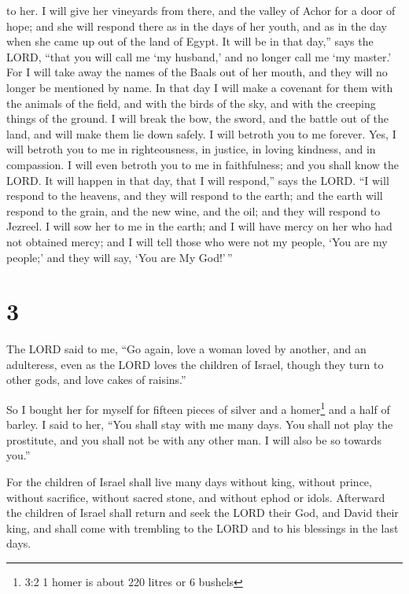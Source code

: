 to her.  I will give her vineyards from there, and the
valley of Achor for a door of hope; and she will respond there as in the
days of her youth, and as in the day when she came up out of the land of
Egypt.  It will be in that day,'' says the LORD, ``that you
will call me `my husband,' and no longer call me `my master.'
 For I will take away the names of the Baals out of her
mouth, and they will no longer be mentioned by name.  In
that day I will make a covenant for them with the animals of the field,
and with the birds of the sky, and with the creeping things of the
ground. I will break the bow, the sword, and the battle out of the land,
and will make them lie down safely.  I will betroth you to
me forever. Yes, I will betroth you to me in righteousness, in justice,
in loving kindness, and in compassion.  I will even betroth
you to me in faithfulness; and you shall know the LORD.  It
will happen in that day, that I will respond,'' says the LORD. ``I will
respond to the heavens, and they will respond to the earth;
 and the earth will respond to the grain, and the new wine,
and the oil; and they will respond to Jezreel.  I will sow
her to me in the earth; and I will have mercy on her who had not
obtained mercy; and I will tell those who were not my people, `You are
my people;' and they will say, `You are My God!'\,''

\hypertarget{section-2}{%
\section{3}\label{section-2}}

 The LORD said to me, ``Go again, love a woman loved by
another, and an adulteress, even as the LORD loves the children of
Israel, though they turn to other gods, and love cakes of raisins.''

 So I bought her for myself for fifteen pieces of silver and
a homer\footnote{3:2 1 homer is about 220 litres or 6 bushels} and a
half of barley.  I said to her, ``You shall stay with me
many days. You shall not play the prostitute, and you shall not be with
any other man. I will also be so towards you.''

 For the children of Israel shall live many days without
king, without prince, without sacrifice, without sacred stone, and
without ephod or idols.  Afterward the children of Israel
shall return and seek the LORD their God, and David their king, and
shall come with trembling to the LORD and to his blessings in the last
days.

